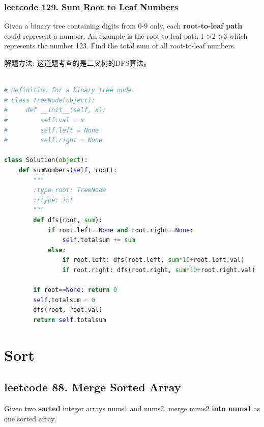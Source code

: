 \documentclass[a4paper,10pt]{article}
\begin{document}
\subsubsection{leetcode 129. Sum Root to Leaf Numbers}
Given a binary tree containing digits from 0-9 only, each \textbf{root-to-leaf path} could represent a number. An example is the root-to-leaf path 1->2->3 which represents the number 123. Find the total sum of all root-to-leaf numbers. \\

\begin{CJK*}{UTF8}{gbsn}
\noindent 解题方法: 这道题考查的是二叉树的DFS算法。\\
\end{CJK*}

\begin{lstlisting}[language=Python, caption=Problem129. Sum Root to Leaf Numbers]

# Definition for a binary tree node.
# class TreeNode(object):
#     def __init__(self, x):
#         self.val = x
#         self.left = None
#         self.right = None

class Solution(object):
    def sumNumbers(self, root):
        """
        :type root: TreeNode
        :rtype: int
        """
        def dfs(root, sum):
            if root.left==None and root.right==None:
                self.totalsum += sum
            else:
                if root.left: dfs(root.left, sum*10+root.left.val)
                if root.right: dfs(root.right, sum*10+root.right.val)
            
        if root==None: return 0
        self.totalsum = 0
        dfs(root, root.val)
        return self.totalsum
\end{lstlisting}






\section{Sort}

\subsection{leetcode 88. Merge Sorted Array}
Given two \textbf{sorted} integer arrays nums1 and nums2, merge nums2 \textbf{into nums1} as one sorted array. \\
\end{document}
